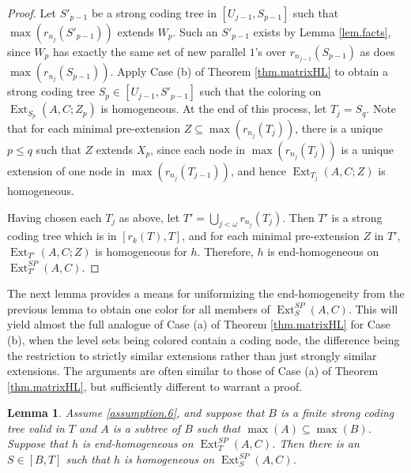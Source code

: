 \documentclass{amsart}
\newtheorem{lem}[thm]{Lemma}
\theoremstyle{remark}
\theoremstyle{definition}
\theoremstyle{remark}
\newcommand{\om}{\omega}
\newcommand{\sse}{\subseteq}
\DeclareMathOperator{\Ext}{Ext}
\begin{document}
\begin{proof}
Let $S'_{p-1}$ be a strong coding tree in $[U_{j-1},S_{p-1}]$ such that $\max(r_{n_j}(S'_{p-1}))$ extends $W_p$.
Such an $S'_{p-1}$ exists by Lemma \ref{lem.facts},
since
 $W_p$
has exactly the same set of new  parallel $1$'s
over  $r_{n_{j-1}}(S_{p-1})$ as does
$\max(r_{n_j}(S_{p-1}))$.
Apply
 Case (b)  of Theorem \ref{thm.matrixHL}
to obtain  a strong coding tree
 $S_p\in [U_{j-1},S'_{p-1}]$ such that the coloring on $\Ext_{S_p}(A,C;Z_p)$ is homogeneous.
At the end of this process, let $T_j=S_q$.
Note that for each minimal pre-extension $Z\sse\max(r_{n_j}(T_j))$,
there is a unique $p\le q$ such that
$Z$ extends $X_p$,
since each node in  $\max(r_{n_j}(T_j))$ is a unique  extension of one node in $\max(r_{n_j}(T_{j-1}))$,
and hence
$\Ext_{T_j}(A,C;Z)$ is homogeneous.



Having chosen each $T_j$ as above,
let $T'=\bigcup_{j<\om}r_{n_j}(T_j)$.
Then $T'$ is a strong coding tree which is
in $[r_k(T),T]$,
and for each minimal pre-extension $Z$ in $T'$,
$\Ext_{T'}(A,C;Z)$ is homogeneous for $h$.
Therefore,  $h$ is end-homogeneous on $\Ext^{SP}_{T'}(A,C)$.
\end{proof}



The next lemma provides a means for uniformizing the  end-homogeneity from the previous lemma
to obtain one color for all
members of  $\Ext_S^{SP}(A,C)$.
This will yield almost the full analogue of Case (a) of Theorem \ref{thm.matrixHL} for Case (b),
when the level sets being colored contain a coding node, the difference being the restriction to strictly similar extensions rather than just strongly similar extensions.
The arguments are often similar to those of
Case (a) of
Theorem \ref{thm.matrixHL}, but sufficiently different to warrant a proof.


\begin{lem}\label{lem.Case(c)}
Assume \ref{assumption.6},  and suppose that $B$ is a finite strong coding tree valid in $T$ and  $A$ is a subtree of $B$
such that $\max(A)\sse\max(B)$.
Suppose that $h$ is end-homogeneous on $\Ext_{T}^{SP}(A,C)$.
Then there is an $S\in[B,T]$ such that $h$ is homogeneous on
 $\Ext_S^{SP}(A,C)$.
\end{lem}
\end{document}
